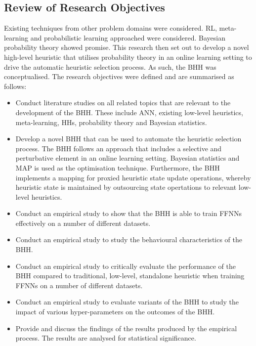 \subsection{Review of Research Objectives}
\label{sec:conclusion:research_goals:research_objectives}

Existing techniques from other problem domains were considered. \acs{RL}, meta-learning and probabilistic learning approached were considered. Bayesian probability theory showed promise. This research then set out to develop a novel high-level heuristic that utilises probability theory in an online learning setting to drive the automatic heuristic selection process. As such, the \acs{BHH} was conceptualised. The research objectives were defined and are summarised as follows:

\begin{itemize}
      \item Conduct literature studies on all related topics that are relevant to the development of the \acs{BHH}. These include \acs{ANN}, existing low-level heuristics, meta-learning, \acp{HH}, probability theory and Bayesian statistics.

      \item Develop a novel \acs{BHH} that can be used to automate the heuristic selection process. The \acs{BHH} follows an approach that includes a selective and perturbative element in an online learning setting. Bayesian statistics and \acs{MAP} is used as the optimisation technique. Furthermore, the \acs{BHH} implements a mapping for proxied heuristic state update operations, whereby heuristic state is maintained by outsourcing state opertations to relevant low-level heuristics.

      \item Conduct an empirical study to show that the \ac{BHH} is able to train \acp{FFNN} effectively on a number of different datasets.

      \item Conduct an empirical study to study the behavioural characteristics of the \acs{BHH}.

      \item Conduct an empirical study to critically evaluate the performance of the \acs{BHH} compared to traditional, low-level, standalone heuristic when training \acp{FFNN} on a number of different datasets.

      \item Conduct an empirical study to evaluate variants of the \acs{BHH} to study the impact of various hyper-parameters on the outcomes of the \ac{BHH}.

      \item Provide and discuss the findings of the results produced by the empirical process. The results are analysed for statistical significance.
\end{itemize}

